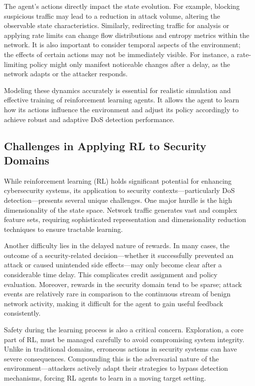 \documentclass[16pt]{report}
\begin{document}
The agent’s actions directly impact the state evolution. For example, blocking suspicious traffic may lead to a reduction in attack volume, altering the observable state characteristics. Similarly, redirecting traffic for analysis or applying rate limits can change flow distributions and entropy metrics within the network. It is also important to consider temporal aspects of the environment; the effects of certain actions may not be immediately visible. For instance, a rate-limiting policy might only manifest noticeable changes after a delay, as the network adapts or the attacker responds.

Modeling these dynamics accurately is essential for realistic simulation and effective training of reinforcement learning agents. It allows the agent to learn how its actions influence the environment and adjust its policy accordingly to achieve robust and adaptive DoS detection performance.



\subsection{Challenges in Applying RL to Security Domains}

While reinforcement learning (RL) holds significant potential for enhancing cybersecurity systems, its application to security contexts—particularly DoS detection—presents several unique challenges. One major hurdle is the high dimensionality of the state space. Network traffic generates vast and complex feature sets, requiring sophisticated representation and dimensionality reduction techniques to ensure tractable learning. 

Another difficulty lies in the delayed nature of rewards. In many cases, the outcome of a security-related decision—whether it successfully prevented an attack or caused unintended side effects—may only become clear after a considerable time delay. This complicates credit assignment and policy evaluation. Moreover, rewards in the security domain tend to be sparse; attack events are relatively rare in comparison to the continuous stream of benign network activity, making it difficult for the agent to gain useful feedback consistently.

Safety during the learning process is also a critical concern. Exploration, a core part of RL, must be managed carefully to avoid compromising system integrity. Unlike in traditional domains, erroneous actions in security systems can have severe consequences. Compounding this is the adversarial nature of the environment—attackers actively adapt their strategies to bypass detection mechanisms, forcing RL agents to learn in a moving target setting.
\end{document}
